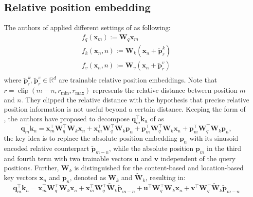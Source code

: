 \documentclass{article}
\def\q{{\boldsymbol q}}
\def\k{{\boldsymbol k}}
\def\p{{\boldsymbol p}}
\def\x{{\boldsymbol x}}
\def\W{{\boldsymbol W}}
\begin{document}
\subsection{Relative position embedding}
The authors of \cite{Shaw2018SelfAttentionWR} applied  different settings of  as following:
\begin{equation}
	\begin{aligned}
		f_q(\x_m):=\W_{q}\x_m\\
		f_k(\x_n, n):=\W_{k}(\x_n+\tilde{\p}^k_r)\\
		f_v(\x_n, n):=\W_{v}(\x_n+\tilde{\p}^v_r)\\
	\end{aligned}
	\label{fn:shaw}
\end{equation}
where $\tilde{\p}^k_r,\tilde{\p}^v_r\in\mathbb{R}^{d}$ are trainable relative position embeddings. Note that $r=\operatorname{clip}(m-n,r_{\text{min}},r_{\text{max}})$ represents the relative distance between position $m$ and $n$. They clipped the relative distance with the hypothesis that precise relative position information is not useful beyond a certain distance.
Keeping the form of , the authors \cite{Dai2019TransformerXLAL} have proposed to decompose $\q_m^{\intercal}\k_n$ of  as 
\begin{equation}
	\q_m^{\intercal}\k_n=\x_m^{\intercal}\W_q^{\intercal}\W_k\x_n+\x_m^{\intercal}\W_q^{\intercal}\W_k\p_n+\p_m^{\intercal}\W_q^{\intercal}\W_k\x_n+\p_m^{\intercal}\W_q^{\intercal}\W_k\p_n,
	\label{fn:rela-posi1}
\end{equation}
the key idea is to replace the absolute position embedding $\p_n$ with its sinusoid-encoded relative counterpart $\tilde{\p}_{m-n}$, while the absolute position $\p_m$ in the third and fourth term with two trainable vectors $\mathbf{u}$ and $\mathbf{v}$ independent of the query positions. Further, $\W_k$ is distinguished for the content-based and location-based key vectors $\x_n$ and $\p_n$, denoted as $\W_k$ and $\widetilde{\W}_k$, resulting in: 
\begin{equation}
	\q_m^{\intercal}\k_n=\x_m^{\intercal}\W_q^{\intercal}\W_k\x_n+\x_m^{\intercal}\W_q^{\intercal}\widetilde{\W}_k\tilde{\p}_{m-n}+\mathbf{u}^{\intercal}\W_q^{\intercal}\W_k\x_n+\mathbf{v}^{\intercal}\W_q^{\intercal}\widetilde{\W}_k\tilde{\p}_{m-n}
	\label{fn:rela-posi2}
\end{equation}
\end{document}
